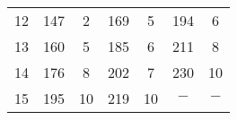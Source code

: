\documentclass[authoryear]{tex/labreport}
\begin{document}
\begin{table}[htb]
\begin{tabular}{rcccccc}
    12                               & 147                         & 2                                                              & 169                                                                                                   & 5                                                                                         & 194                                                                                                      & 6                                                                                                                                                  \\
    13                               & 160                         & 5                                                              & 185                                                                                                   & 6                                                                                         & 211                                                                                                      & 8                                                                                                                                                                                             \\
    14                               & 176                         & 8                                                              & 202                                                                                                   & 7                                                                                         & 230                                                                                                      & 10                                                                                                                                                                                              \\
    15                               & 195                         & 10                                                             & 219                                                                                                   & 10                                                                                        & $-$                                                                                                      & $-$                                                                                                                                                                                           \\

\end{tabular}
\end{table}
\end{document}
